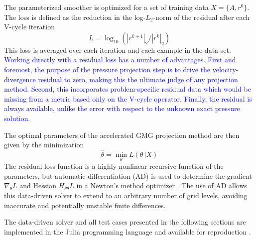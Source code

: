 \documentclass[review]{elsarticle}
\begin{document}
The parameterized smoother is optimized for a set of training data $X=\{A,r^0\}$. The loss is defined as the reduction in the log-$L_2$-norm of the residual after each V-cycle iteration 
$$L = \log_{10}(|r^{k+1}|_2 / |r^{k}|_2)$$
This loss is averaged over each iteration and each example in the data-set. \textcolor{blue}{Working directly with a residual loss has a number of advantages. First and foremost, the purpose of the pressure projection step is to drive the velocity-divergence residual to zero, making this the ultimate judge of any projection method. Second, this incorporates problem-specific residual data which would be missing from a metric based only on the V-cycle operator. Finally, the residual is always available, unlike the error with respect to the unknown exact pressure solution.}

The optimal parameters of the accelerated GMG projection method are then given by the minimization
\begin{equation}
    \hat\theta = \min_\theta L(\theta\, |X)
\end{equation}
The residual loss function is a highly nonlinear recursive function of the parameters, but automatic differentiation (AD) is used to determine the gradient $\nabla_\theta L$ and Hessian $H_{\theta\theta} L$ in a Newton's method optimizer  \cite{mogensen2018optim,RevelsLubinPapamarkou2016}. The use of AD allows this data-driven solver to extend to an arbitrary number of grid levels, avoiding inaccurate and potentially unstable finite differences.

The data-driven solver and all test cases presented in the following sections are implemented in the Julia programming language \cite{bezanson2017julia} and available for reproduction \cite{weymouth2021julia}.
\end{document}
